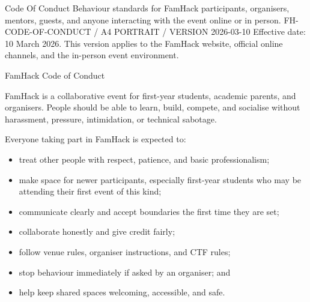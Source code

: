 \documentclass[11pt]{article}
\begin{document}
\FHCover
  {Code Of Conduct}
  {Behaviour standards for FamHack participants, organisers, mentors, guests, and anyone interacting with the event online or in person.}
  {FH-CODE-OF-CONDUCT / A4 PORTRAIT / VERSION 2026-03-10}
  {Effective date: 10 March 2026.\newline
  This version applies to the FamHack website, official online channels, and the in-person event environment.}

{\fhbold\fontsize{18}{18}\selectfont FamHack Code of Conduct\par}
\vspace{0.3em}
FamHack is a collaborative event for first-year students, academic parents, and organisers. People should be able to learn, build, compete, and socialise without harassment, pressure, intimidation, or technical sabotage.


\vspace{0.6em}

Everyone taking part in FamHack is expected to:
\begin{itemize}
  \item treat other people with respect, patience, and basic professionalism;
  \item make space for newer participants, especially first-year students who may be attending their first event of this kind;
  \item communicate clearly and accept boundaries the first time they are set;
  \item collaborate honestly and give credit fairly;
  \item follow venue rules, organiser instructions, and CTF rules;
  \item stop behaviour immediately if asked by an organiser; and
  \item help keep shared spaces welcoming, accessible, and safe.
\end{itemize}
\end{document}
